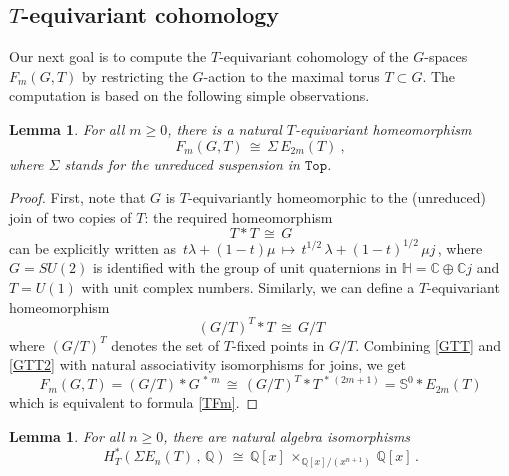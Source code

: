 \documentclass[11pt]{amsart}
\newtheorem{lemma}[theorem]{Lemma}
\theoremstyle{definition}
\theoremstyle{remark}
\numberwithin{equation}{section}
\newcommand{\la}{\label}
\newcommand{\Top}{\mathtt{Top}}
\def\bS{\mathbb S}
\def\C{\mathbb C}
\def\Q{\mathbb{Q}}
\begin{document}
\subsection{$T$-equivariant cohomology}
\la{S4.31}
Our next goal is to compute the $T$-equivariant cohomology of the $G$-spaces $F_m(G,T)$
by restricting the $G$-action to the maximal torus $ T \subset G $.
The computation is based on the following simple observations.
%
\begin{lemma}
\la{Teq}
For all $m \ge 0 $, there is a natural $T$-equivariant homeomorphism
%
\begin{equation}
\la{TFm}
F_m(G, T)  \,\cong\, \Sigma\,E_{2m}(T)\ ,
\end{equation}
%
where $\Sigma$ stands for the unreduced suspension in $ \Top $.
\end{lemma}
%
\begin{proof}
First, note that $ G $ is $T$-equivariantly homeomorphic to the 
(unreduced) join of two copies of $T$: the required homeomorphism
%
\begin{equation}
\la{GTT}
T \ast T \,\cong \, G
\end{equation}
%
can be explicitly written as $\,t \lambda + (1-t) \mu \,\mapsto\, t^{1/2}\, \lambda + (1-t)^{1/2}\, \mu j\,$, where $G = SU(2) $ is identified with the group of unit quaternions in $ {\mathbb H} = \C \oplus \C j $ and $ T = U(1) $ with unit complex numbers. Similarly, we can define a $T$-equivariant homeomorphism
%
\begin{equation}
\la{GTT2}
(G/T)^T \ast T \,\cong\,  G/T
\end{equation}
%
where $ (G/T)^T $ denotes the set of $T$-fixed points in $G/T$.
Combining \eqref{GTT} and \eqref{GTT2} with natural associativity isomorphisms for joins, we get
%
\begin{equation}
\la{FmT}
F_m(G,T) = (G/T) \ast G^{\,\ast\,m} \,\cong\,  (G/T)^T \ast T^{\,\ast\,(2m+1)} = \bS^0 \ast E_{2m}(T)
\end{equation}
%
which is equivalent to formula \eqref{TFm}.
\end{proof}
%
\begin{lemma}
\la{TLem}
For all $ n \ge 0 $, there are natural algebra isomorphisms 
%
\begin{equation}
\la{Tcoh}
H_{T}^*(\Sigma E_n(T)\,,\,\Q)\,\cong\, \Q[x]\,\times_{\Q[x]/(x^{n+1})}\,\Q[x]\,.    
\end{equation}
%
\end{lemma}
%
\end{document}
